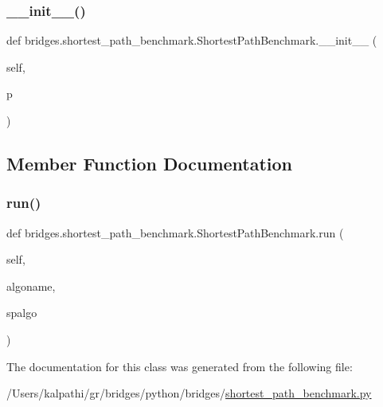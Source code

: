 \subsubsection{\texorpdfstring{\_\_init\_\_()}{\_\_init\_\_()}}
{\footnotesize\ttfamily def bridges.\+shortest\+\_\+path\+\_\+benchmark.\+Shortest\+Path\+Benchmark.\+\_\+\+\_\+init\+\_\+\+\_\+ (\begin{DoxyParamCaption}\item[{}]{self,  }\item[{}]{p }\end{DoxyParamCaption})}



\subsection{Member Function Documentation}
\mbox{\label{classbridges_1_1shortest__path__benchmark_1_1_shortest_path_benchmark_aba41366eff6ee3281ba4decd8d57b089}} 
\subsubsection{\texorpdfstring{run()}{run()}}
{\footnotesize\ttfamily def bridges.\+shortest\+\_\+path\+\_\+benchmark.\+Shortest\+Path\+Benchmark.\+run (\begin{DoxyParamCaption}\item[{}]{self,  }\item[{}]{algoname,  }\item[{}]{spalgo }\end{DoxyParamCaption})}



The documentation for this class was generated from the following file\+:\begin{DoxyCompactItemize}
\item 
/\+Users/kalpathi/gr/bridges/python/bridges/\mbox{\hyperlink{shortest__path__benchmark_8py}{shortest\+\_\+path\+\_\+benchmark.\+py}}\end{DoxyCompactItemize}
